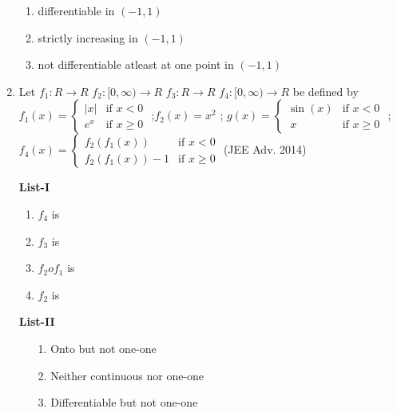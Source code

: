\documentclass[journal,12pt,twocolumn]{IEEEtran}
\theoremstyle{remark}
\begin{document}
\begin{enumerate}
\begin{multicols}{2}
\begin{enumerate}[label=(\alph*), start=16]
					\item differentiable in $(-1,1)$

					\item strictly increasing in $(-1,1)$

					\item  not differentiable atleast at one point in  $(-1,1)$
				\end{enumerate}
			\end{multicols}
		\item Let $f_1:R\rightarrow R$ $f_2:[0,\infty)\rightarrow R$ $f_3:R\rightarrow R$ $f_4:[0,\infty)\rightarrow R$ be defined by 
         $f_1(x) =
        \begin{cases}
                 |x| & \text{if } x < 0 \\
                 e^x & \text{if } x \geq 0 
                 \end{cases}$
                 ;$f_2(x)=x^2$ ; $g(x) =
                 \begin{cases}
                    \sin(x) & \text{if }  x < 0 \\
                    \ x & \text{if }  x\geq 0
                  \end{cases}$
                  ;$f_4(x) =
                  \begin{cases}
                     f_2(f_1(x)) & \text{if } x < 0 \\
                     f_2(f_1(x))-1 & \text{if } x \geq 0 
                  \end{cases}$
                  \hfill(JEE Adv. 2014)
                 \begin{multicols}{2} 
				\textbf{List-I} 
				\begin{enumerate}[label=\Alph*., start=16]
					\item $f_4$ is
					\item $f_3$ is 
					\item $f_2of_1$ is 
					\item $f_2$ is
				\end{enumerate}
				\columnbreak
				\textbf{List-II}
				\begin{enumerate}
					\item[1.]  Onto but not one-one 

					\item[2.]  Neither continuous nor one-one 

					\item[3.]  Differentiable but not one-one 


\end{enumerate}
\end{multicols}
\end{enumerate}
\end{document}
